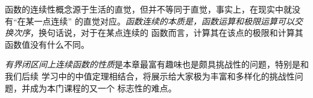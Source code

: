 函数的连续性概念源于生活的直觉，但并不等同于直觉，事实上，在现实中就没有“在某一点连续”
的直觉对应。{\it 函数连续的本质是，函数运算和极限运算可以交换次序}，换句话说，对于在某点连续的
函数而言，计算其在该点的极限和计算其函数值没有什么不同。

{\it 有界闭区间上连续函数的性质}是本章最富有趣味也是颇具挑战性的问题，特别是和我们后续
学习中的中值定理相结合，将展示给大家极为丰富和多样化的挑战性问题，并成为本门课程的又一个
标志性的难点。


% 
%   
